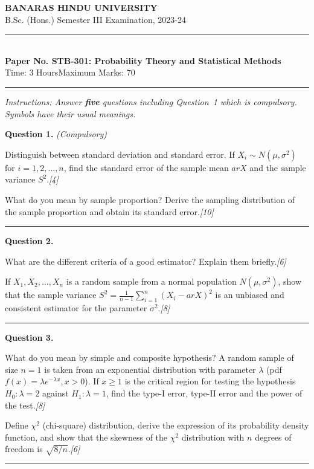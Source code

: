 \documentclass[11pt,a4paper]{article}
\newcommand{\pts}[1]{\hfill   \textit{[#1]}}
\begin{document}
\begin{center}
  {\large\bfseries BANARAS HINDU UNIVERSITY}\\[2pt]
  {\normalsize B.Sc. (Hons.) Semester III Examination, 2023-24}\\[6pt]
  \rule{0.8\linewidth}{0.5pt}\\[6pt]
  {\large\bfseries Paper No. STB-301: Probability Theory and Statistical Methods}\\[4pt]
  {\normalsize Time: 3 Hours\hfill Maximum Marks: 70}
\end{center}
\rule{\linewidth}{0.4pt}
\smallskip



\noindent   \textit{Instructions: Answer   \textbf{five} questions including Question~1 which is compulsory. Symbols have their usual meanings.}
\bigskip




\noindent   \textbf{Question 1.}   \textit{(Compulsory)}

\begin{parts}
  \item Distinguish between standard deviation and standard error. If $X_i \sim N(\mu, \sigma^2)$ for $i = 1,2,\dots,n$, find the standard error of the sample mean $ar{X}$ and the sample variance $S^2$.\pts{4}
  \item What do you mean by sample proportion? Derive the sampling distribution of the sample proportion and obtain its standard error.\pts{10}
\end{parts}
\medskip\rule{\linewidth}{0.2pt}

\medskip


\noindent   \textbf{Question 2.}

\begin{parts}
  \item What are the different criteria of a good estimator? Explain them briefly.\pts{6}
  \item If $X_1, X_2, \dots, X_n$ is a random sample from a normal population $N(\mu, \sigma^2)$, show that the sample variance $S^2 = \frac{1}{n-1}\sum_{i=1}^n (X_i - ar{X})^2$ is an unbiased and consistent estimator for the parameter $\sigma^2$.\pts{8}
\end{parts}
\medskip\rule{\linewidth}{0.2pt}

\medskip


\noindent   \textbf{Question 3.}

\begin{parts}
  \item What do you mean by simple and composite hypothesis? A random sample of size $n=1$ is taken from an exponential distribution with parameter $\lambda$ (pdf $f(x) = \lambda e^{-\lambda x}, x > 0$). If $x \geq 1$ is the critical region for testing the hypothesis $H_0: \lambda = 2$ against $H_1: \lambda = 1$, find the type-I error, type-II error and the power of the test.\pts{8}
  \item Define $\chi^2$ (chi-square) distribution, derive the expression of its probability density function, and show that the skewness of the $\chi^2$ distribution with $n$ degrees of freedom is $\sqrt{8/n}$.\pts{6}
\end{parts}
\medskip\rule{\linewidth}{0.2pt}
\end{document}
